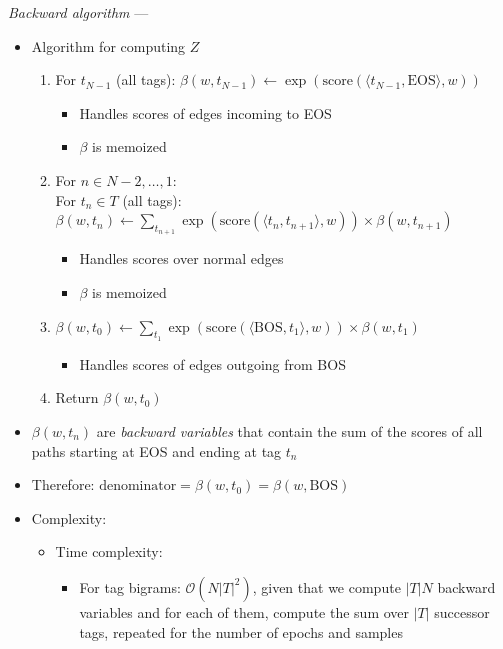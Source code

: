 \emph{Backward algorithm} --- 
\begin{itemize}
    \item Algorithm for computing $Z$
    \begin{enumerate}
        \item For $t_{N-1}$ (all tags):
        $
        \beta(w, t_{N-1}) \gets \exp(\textrm{score}(\langle t_{N-1}, \textrm{EOS} \rangle, w))
        $
        \begin{itemize}
            \item Handles scores of edges incoming to EOS
            \item $\beta$ is memoized
        \end{itemize}
        \item For $n \in N-2, \dots, 1$:\\
        For $t_n \in T$ (all tags):
        $
        \beta(w, t_n) \gets \sum_{t_{n+1}} \exp(\textrm{score}(\langle t_n, t_{n+1} \rangle, w)) \times \beta(w, t_{n+1})
        $
        \begin{itemize}
            \item Handles scores over normal edges
            \item $\beta$ is memoized
        \end{itemize}
        \item 
        $
        \beta(w, t_0) \gets \sum_{t_1} \exp(\textrm{score}(\langle \textrm{BOS}, t_1 \rangle, w)) \times \beta(w, t_1)
        $
        \begin{itemize}
            \item Handles scores of edges outgoing from BOS
        \end{itemize}
        \item Return $\beta(w, t_0)$
    \end{enumerate}
    \item $\beta(w, t_n)$ are \emph{backward variables} that contain the sum of the scores of all paths starting at EOS and ending at tag $t_n$
    \item Therefore:
    $
    \textrm{denominator} = \beta(w, t_0) = \beta(w, \textrm{BOS})
    $
    \item Complexity:
    \begin{itemize}
        \item Time complexity: 
        \begin{itemize}
            \item For tag bigrams: $\mathcal{O}(N |T|^2)$, given that we compute $|T| N$ backward variables and for each of them, compute the sum over $|T|$ successor tags, repeated for the number of epochs and samples

\end{itemize}
\end{itemize}
\end{itemize}
